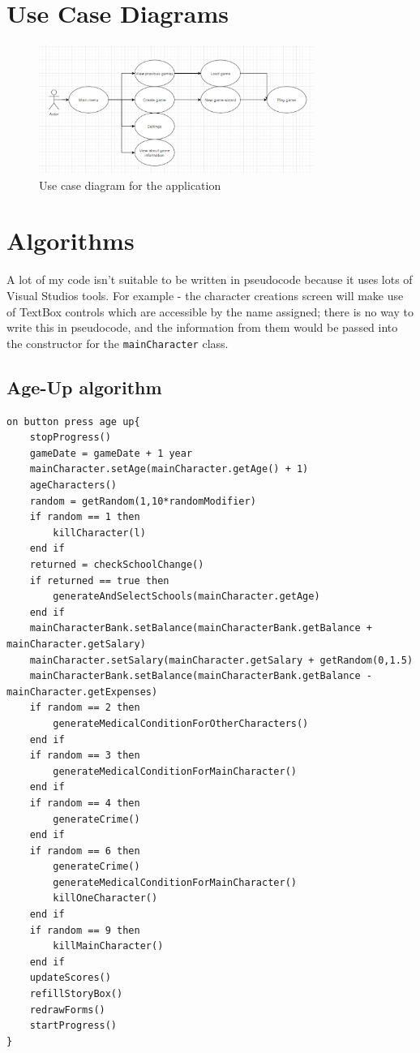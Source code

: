 \section{Use Case Diagrams}
\begin{figure}[H]
    \centering
    \includegraphics[width=0.8\textwidth]{images/design/useCaseDiagram.png}
    \caption{Use case diagram for the application}
    \label{fig:design-useCaseDiagram}
\end{figure}

\section{Algorithms}
A lot of my code isn’t suitable to be written in pseudocode because it uses lots of Visual Studios tools. For example - the character creations screen will make use of TextBox controls which are accessible by the name assigned; there is no way to write this in pseudocode, and the information from them would be passed into the constructor for the \verb|mainCharacter| class.
\subsection{Age-Up algorithm}
\begin{lstlisting}[style=pseudo]
on button press age up{
	stopProgress()
	gameDate = gameDate + 1 year
	mainCharacter.setAge(mainCharacter.getAge() + 1)
	ageCharacters()
	random = getRandom(1,10*randomModifier)
	if random == 1 then
		killCharacter(l)
	end if
	returned = checkSchoolChange()
	if returned == true then
		generateAndSelectSchools(mainCharacter.getAge)
	end if
	mainCharacterBank.setBalance(mainCharacterBank.getBalance + mainCharacter.getSalary)
	mainCharacter.setSalary(mainCharacter.getSalary + getRandom(0,1.5)
	mainCharacterBank.setBalance(mainCharacterBank.getBalance - mainCharacter.getExpenses)
	if random == 2 then
		generateMedicalConditionForOtherCharacters()
	end if
	if random == 3 then
		generateMedicalConditionForMainCharacter()
	end if
	if random == 4 then
		generateCrime()
	end if
	if random == 6 then
		generateCrime()
		generateMedicalConditionForMainCharacter()
		killOneCharacter()
	end if
	if random == 9 then
		killMainCharacter()
	end if
	updateScores()
	refillStoryBox()
	redrawForms()
	startProgress()
}
\end{lstlisting}

